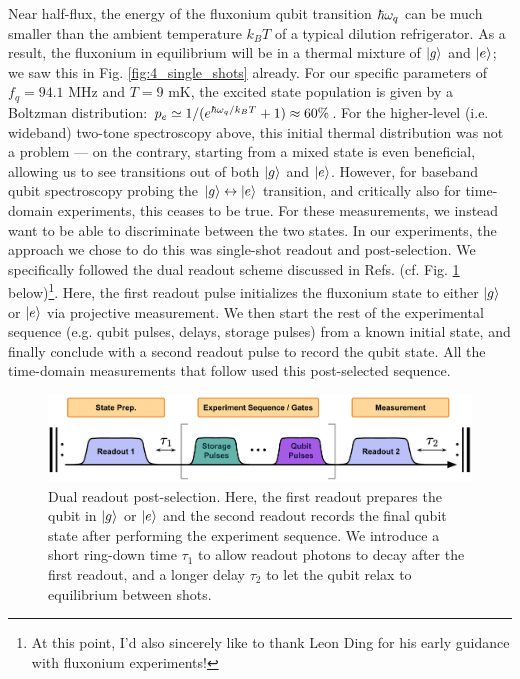 Near half-flux, the energy of the fluxonium qubit transition $\hbar\omega_q$ can be much smaller than the ambient temperature $k_BT$ of a typical dilution refrigerator. As a result, the fluxonium in equilibrium will be in a thermal mixture of $\lvert g\rangle$ and $\lvert e\rangle$; we saw this in Fig. \ref{fig:4_single_shots} already. For our specific parameters of $f_q = 94.1$ MHz and $T = 9$ mK, the excited state population is given by a Boltzman distribution: $p_e \simeq 1 / (e^{\hbar\omega_q/k_B T} + 1) \approx 60\%$. For the higher-level (i.e. wideband) two-tone spectroscopy above, this initial thermal distribution was not a problem --- on the contrary, starting from a mixed state is even beneficial, allowing us to see transitions out of both $\lvert g\rangle$ and $\lvert e\rangle$. However, for baseband qubit spectroscopy probing the $\lvert g\rangle\leftrightarrow\lvert e\rangle$ transition, and critically also for time-domain experiments, this ceases to be true. For these measurements, we instead want to be able to discriminate between the two states. In our experiments, the approach we chose to do this was single-shot readout and post-selection. We specifically followed the dual readout scheme discussed in Refs. \cite{ding2023FTF, ding2023thesis} (cf. Fig. \ref{fig:4_postselection} below)\footnote{At this point, I'd also sincerely like to thank Leon Ding for his early guidance with fluxonium experiments!}. Here, the first readout pulse initializes the fluxonium state to either $\lvert g\rangle$ or $\lvert e\rangle$ via projective measurement. We then start the rest of the experimental sequence (e.g. qubit pulses, delays, storage pulses) from a known initial state, and finally conclude with a second readout pulse to record the qubit state. All the time-domain measurements that follow used this post-selected sequence. 

\begin{figure}[b!]
    \centering
    \includegraphics[width=0.9\linewidth]{Figures/4/postselection.pdf}
    \caption{Dual readout post-selection. Here, the first readout prepares the qubit in $\lvert g\rangle$ or $\lvert e\rangle$ and the second readout records the final qubit state after performing the experiment sequence. We introduce a short ring-down time $\tau_1$ to allow readout photons to decay after the first readout, and a longer delay $\tau_2$ to let the qubit relax to equilibrium between shots.}
    \label{fig:4_postselection}
\end{figure}
\clearpage

